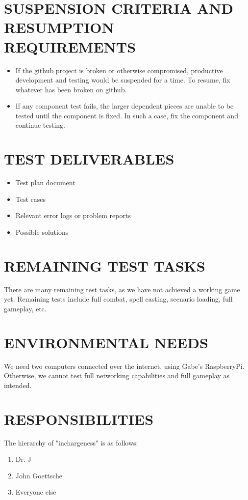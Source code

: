 \section[SUSPENSION CRITERIA]{\bfseries\color{black}
	 SUSPENSION CRITERIA AND RESUMPTION REQUIREMENTS}
{\color{black}
\begin{itemize}
\item If the github project is broken or otherwise compromised, productive development and testing would be suspended for a time. To resume, fix whatever has been broken on github.
\item If any component test fails, the larger dependent pieces are unable to be tested until the component is fixed. In such a case, fix the component and continue testing.
\end{itemize}

\section[TEST DELIVERABLES]{\bfseries\color{black} TEST DELIVERABLES}
{\color{black}
\begin{itemize}
\item Test plan document
\item Test cases
\item Relevant error logs or problem reports
\item Possible solutions
\end{itemize}
}

\section[REMAINING TEST TASKS]{\bfseries\color{black} REMAINING TEST TASKS}
{\color{black}
There are many remaining test tasks, as we have not achieved a working game yet. Remaining tests include full combat, spell casting, scenario loading, full gameplay, etc. }

\section[ENVIRONMENTAL NEEDS]{\bfseries\color{black} ENVIRONMENTAL NEEDS}
{\color{black}
We need two computers connected over the internet, using Gabe's RaspberryPi. Otherwise, we cannot test full networking capabilities and full gameplay as intended. 
}

\section[RESPONSIBILITIES]{\bfseries\color{black} RESPONSIBILITIES}
{\color{black}
The hierarchy of "inchargeness" is as follows:
\begin{enumerate}
\item Dr. J
\item John Goettsche
\item Everyone else
\end{enumerate}
}
}
